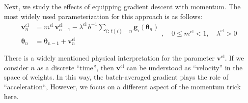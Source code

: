 \documentclass[12pt,a4paper]{amsart}
\numberwithin{equation}{section}
\theoremstyle{remark}
\begin{document}
Next, we study the effects of equipping gradient descent with momentum.
The most widely used parameterization for this approach is as follows:
\begin{equation}
	\begin{aligned}
		\mathbf{v}^{\text{cl}}_n
			&= m^{\text{cl}}\, \mathbf{v}^{\text{cl}}_{n-1}
			- \lambda^{\text{cl}}\, b^{-1} \sum_{i:~ t(i) = n} \mathbf{g}_i(\boldsymbol\theta_n) \\
		\mathbf{\boldsymbol\theta}_n &=
			\boldsymbol\theta_{n-1} + \mathbf{v}^{\text{cl}}_n
	\end{aligned},\quad
	0 \leq m^{\text{cl}} <1, \quad
	\lambda^{\text{cl}} > 0
	\label{Formula: classic SGD with momentum}
\end{equation}

There is a widely mentioned physical interpretation for the parameter
$\mathbf{v}^{\text{cl}}$.
If we consider
$n$
as a discrete
``time'',
then
$\mathbf{v}^{\text{cl}}$
can be understood as ``velocity'' in the space of weights.
In this way, the batch-averaged gradient plays the role of ``acceleration``,
However, we focus on a different aspect of the momentum trick here.
\end{document}
